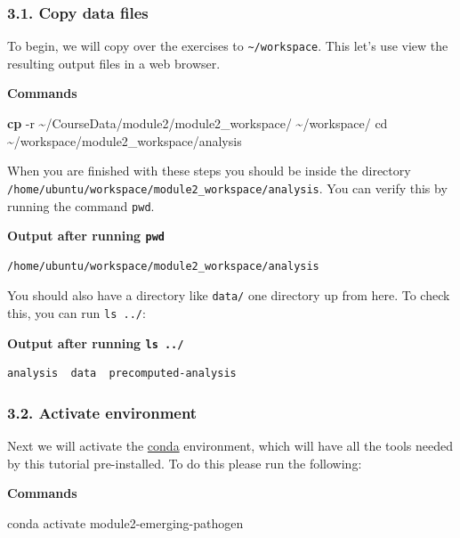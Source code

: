 \documentclass[
]{book}
\newenvironment{Shaded}{\begin{snugshade}}{\end{snugshade}}
\newcommand{\AttributeTok}[1]{\textcolor[rgb]{0.13,0.29,0.53}{#1}}
\newcommand{\BuiltInTok}[1]{#1}
\newcommand{\ExtensionTok}[1]{#1}
\newcommand{\FunctionTok}[1]{\textcolor[rgb]{0.13,0.29,0.53}{\textbf{#1}}}
\newcommand{\NormalTok}[1]{#1}
\begin{document}
\subsubsection{3.1. Copy data files}\label{copy-data-files}

To begin, we will copy over the exercises to \texttt{\textasciitilde{}/workspace}. This let's use view the resulting output files in a web browser.

\textbf{Commands}

\begin{Shaded}
\begin{Highlighting}[]
\FunctionTok{cp} \AttributeTok{{-}r}\NormalTok{ \textasciitilde{}/CourseData/module2/module2\_workspace/ \textasciitilde{}/workspace/}
\BuiltInTok{cd}\NormalTok{ \textasciitilde{}/workspace/module2\_workspace/analysis}
\end{Highlighting}
\end{Shaded}

When you are finished with these steps you should be inside the directory \texttt{/home/ubuntu/workspace/module2\_workspace/analysis}. You can verify this by running the command \texttt{pwd}.

\textbf{Output after running \texttt{pwd}}

\begin{verbatim}
/home/ubuntu/workspace/module2_workspace/analysis
\end{verbatim}

You should also have a directory like \texttt{data/} one directory up from here. To check this, you can run \texttt{ls\ ../}:

\textbf{Output after running \texttt{ls\ ../}}

\begin{verbatim}
analysis  data  precomputed-analysis
\end{verbatim}

\subsubsection{3.2. Activate environment}\label{activate-environment}

Next we will activate the \href{https://docs.conda.io/en/latest/}{conda} environment, which will have all the tools needed by this tutorial pre-installed. To do this please run the following:

\textbf{Commands}

\begin{Shaded}
\begin{Highlighting}[]
\ExtensionTok{conda}\NormalTok{ activate module2{-}emerging{-}pathogen}
\end{Highlighting}
\end{Shaded}
\end{document}
